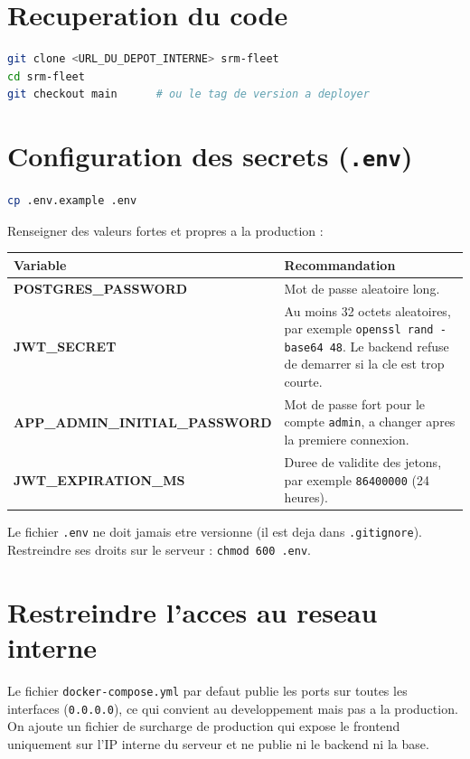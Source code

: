 \documentclass[11pt]{article}
\begin{document}
\section{Recuperation du code}
\begin{lstlisting}[language=bash]
git clone <URL_DU_DEPOT_INTERNE> srm-fleet
cd srm-fleet
git checkout main      # ou le tag de version a deployer
\end{lstlisting}

\section{Configuration des secrets (\texttt{.env})}
\begin{lstlisting}[language=bash]
cp .env.example .env
\end{lstlisting}

Renseigner des valeurs fortes et propres a la production :

\begin{center}
\renewcommand{\arraystretch}{1.35}
\begin{tabularx}{\linewidth}{>{\bfseries}l Y}
\toprule
{} Variable & Recommandation \\
\midrule
POSTGRES\_PASSWORD & Mot de passe aleatoire long. \\
JWT\_SECRET & Au moins 32 octets aleatoires, par exemple \texttt{openssl rand -base64 48}. Le backend refuse de demarrer si la cle est trop courte. \\
APP\_ADMIN\_INITIAL\_PASSWORD & Mot de passe fort pour le compte \texttt{admin}, a changer apres la premiere connexion. \\
JWT\_EXPIRATION\_MS & Duree de validite des jetons, par exemple \texttt{86400000} (24 heures). \\
\bottomrule
\end{tabularx}
\end{center}

\begin{srmwarn}
Le fichier \texttt{.env} ne doit jamais etre versionne (il est deja dans \texttt{.gitignore}).
Restreindre ses droits sur le serveur : \texttt{chmod 600 .env}.
\end{srmwarn}

\section{Restreindre l'acces au reseau interne}
Le fichier \texttt{docker-compose.yml} par defaut publie les ports sur toutes les interfaces
(\texttt{0.0.0.0}), ce qui convient au developpement mais pas a la production. On ajoute un fichier
de surcharge de production qui expose le frontend uniquement sur l'IP interne du serveur et ne publie
ni le backend ni la base.
\end{document}
